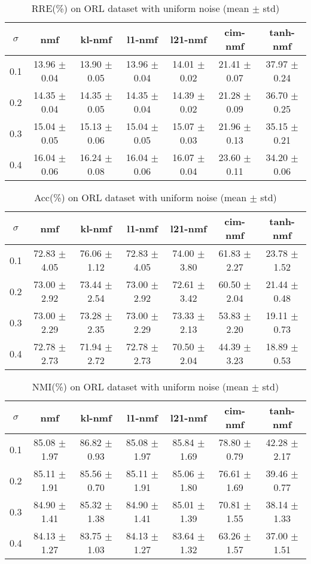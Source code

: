 \documentclass{article} %
\begin{document}
\begin{table}
\begin{tabular}{c|cccccc}$\sigma$ & nmf & kl-nmf & l1-nmf & l21-nmf & cim-nmf & tanh-nmf \\\hline
0.1 & 13.96 $\pm$ 0.04 & 13.90 $\pm$ 0.05 & 13.96 $\pm$ 0.04 & 14.01 $\pm$ 0.02 & 21.41 $\pm$ 0.07 & 37.97 $\pm$ 0.24 \\
0.2 & 14.35 $\pm$ 0.04 & 14.35 $\pm$ 0.05 & 14.35 $\pm$ 0.04 & 14.39 $\pm$ 0.02 & 21.28 $\pm$ 0.09 & 36.70 $\pm$ 0.25 \\
0.3 & 15.04 $\pm$ 0.05 & 15.13 $\pm$ 0.06 & 15.04 $\pm$ 0.05 & 15.07 $\pm$ 0.03 & 21.96 $\pm$ 0.13 & 35.15 $\pm$ 0.21 \\
0.4 & 16.04 $\pm$ 0.06 & 16.24 $\pm$ 0.08 & 16.04 $\pm$ 0.06 & 16.07 $\pm$ 0.04 & 23.60 $\pm$ 0.11 & 34.20 $\pm$ 0.06 \\
\end{tabular}\caption{
  RRE(\%) on ORL dataset with uniform noise (mean $\pm$ std)
  \label{tab:RRE-ORL-uniform}
}\end{table}
\begin{table}
\begin{tabular}{c|cccccc}$\sigma$ & nmf & kl-nmf & l1-nmf & l21-nmf & cim-nmf & tanh-nmf \\\hline
0.1 & 72.83 $\pm$ 4.05 & 76.06 $\pm$ 1.12 & 72.83 $\pm$ 4.05 & 74.00 $\pm$ 3.80 & 61.83 $\pm$ 2.27 & 23.78 $\pm$ 1.52 \\
0.2 & 73.00 $\pm$ 2.92 & 73.44 $\pm$ 2.54 & 73.00 $\pm$ 2.92 & 72.61 $\pm$ 3.42 & 60.50 $\pm$ 2.04 & 21.44 $\pm$ 0.48 \\
0.3 & 73.00 $\pm$ 2.29 & 73.28 $\pm$ 2.35 & 73.00 $\pm$ 2.29 & 73.33 $\pm$ 2.13 & 53.83 $\pm$ 2.20 & 19.11 $\pm$ 0.73 \\
0.4 & 72.78 $\pm$ 2.73 & 71.94 $\pm$ 2.72 & 72.78 $\pm$ 2.73 & 70.50 $\pm$ 2.04 & 44.39 $\pm$ 3.23 & 18.89 $\pm$ 0.53 \\
\end{tabular}\caption{
  Acc(\%) on ORL dataset with uniform noise (mean $\pm$ std)
  \label{tab:Acc-ORL-uniform}
}\end{table}
\begin{table}
\begin{tabular}{c|cccccc}$\sigma$ & nmf & kl-nmf & l1-nmf & l21-nmf & cim-nmf & tanh-nmf \\\hline
0.1 & 85.08 $\pm$ 1.97 & 86.82 $\pm$ 0.93 & 85.08 $\pm$ 1.97 & 85.84 $\pm$ 1.69 & 78.80 $\pm$ 0.79 & 42.28 $\pm$ 2.17 \\
0.2 & 85.11 $\pm$ 1.91 & 85.56 $\pm$ 0.70 & 85.11 $\pm$ 1.91 & 85.06 $\pm$ 1.80 & 76.61 $\pm$ 1.69 & 39.46 $\pm$ 0.77 \\
0.3 & 84.90 $\pm$ 1.41 & 85.32 $\pm$ 1.38 & 84.90 $\pm$ 1.41 & 85.01 $\pm$ 1.39 & 70.81 $\pm$ 1.55 & 38.14 $\pm$ 1.33 \\
0.4 & 84.13 $\pm$ 1.27 & 83.75 $\pm$ 1.03 & 84.13 $\pm$ 1.27 & 83.64 $\pm$ 1.32 & 63.26 $\pm$ 1.57 & 37.00 $\pm$ 1.51 \\
\end{tabular}\caption{
  NMI(\%) on ORL dataset with uniform noise (mean $\pm$ std)
  \label{tab:NMI-ORL-uniform}
}\end{table}
\end{document}
